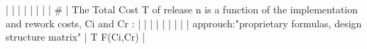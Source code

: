 |    |            |      |                                                                      |                                                                                                                                                                          |                                                                                                                                                                                                                                                            |                                                                                                                                                                                                                                                                      |  #                                                                                                                                                                                                                                                                                                       | The Total Cost T of release n is a function of the implementation and rework costs, Ci and Cr :                                                                                                                                                                                                                                                                                                                                                                                          |
|    |            |      |                                                                      |                                                                                                                                                                          |                                                                                                                                                                                                                                                            |                                                                                                                                                                                                                                                                      |  approuch:"proprietary formulas, design structure matrix"                                                                                                                                                                                                                                                | T F(Ci,Cr)                                                                                                                                                                                                                                                                                                                                                                                                                                                                               |
